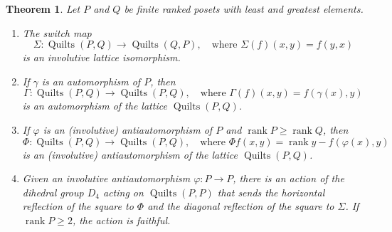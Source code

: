 \documentclass[12pt]{amsart}
\numberwithin{equation}{section}
\newtheorem{theorem}{Theorem}[section]
\theoremstyle{definition}
\newcommand{\quilt}{\operatorname{Quilts}}
\newcommand{\rank}{\operatorname{rank}}
\begin{document}
\begin{theorem}
 Let $P$ and $Q$ be finite ranked posets with least and greatest
elements.
 \begin{enumerate}
 \item The switch map
 $$\Sigma \colon \quilt(P,Q) \to \quilt(Q,P), \quad \text{where }\Sigma(f)(x,y) = f(y,x)$$
 is an involutive lattice isomorphism.
 \item If $\gamma$ is an automorphism of $P$, then
 $$\Gamma \colon  \quilt(P,Q) \to \quilt(P,Q), \quad \text{where }\Gamma(f)(x,y) = f(\gamma(x), y)$$
 is an automorphism of the lattice $\quilt(P,Q)$.
 \item If $\varphi$ is an (involutive) antiautomorphism of $P$ and $\rank P \geq \rank Q$, then
 $$\Phi \colon \quilt(P,Q) \to \quilt(P,Q), \quad \text{where } \Phi f(x,y) = \rank y - f(\varphi(x), y)$$
 is an (involutive) antiautomorphism of the lattice $\quilt(P,Q)$.
 \item Given an involutive antiautomorphism $\varphi \colon P \to P$, there is an action of the dihedral group $D_4$ acting on $\quilt(P,P)$ that sends the horizontal reflection of the square to $\Phi$ and the diagonal reflection of the square to $\Sigma$. If $\rank P \geq 2$, the action is faithful.
 \end{enumerate}
\end{theorem}
\end{document}
